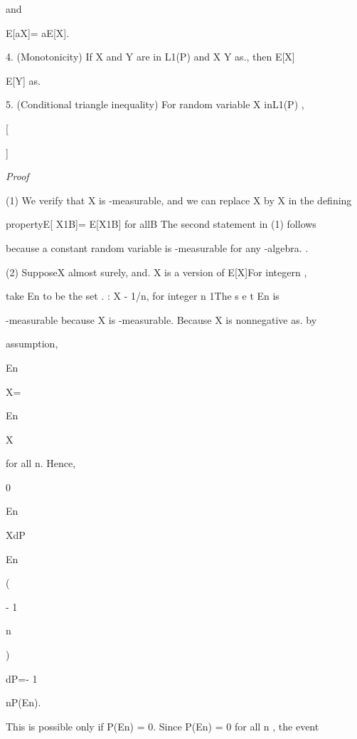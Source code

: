 and

E[aX\vert{}]= aE[X\vert{}].

4. (Monotonicity) If X and Y are in L1(P) and X \leq Y as., then E[X\vert{}]\leq

E[Y\vert{}] as.

5. (Conditional triangle inequality) For random variable X inL1(P) ,

\vert\vert{}

\vert\vert\vert \leqE

[

\vertX\vert\vert {}

]

\textit{Proof}

(1) We verify that X is -measurable, and we can replace X by X in the defining

propertyE[ X1B]= E[X1B] for allB \in{}The second statement in (1) follows

because a constant random variable is -measurable for any \sigma-algebra. .

(2) SupposeX  almost surely, and. X is a version of E[X\vert{}]For integern ,

take En to be the set .{ : X \leq- 1/n}, for integer n \geq 1The s e t En is

-measurable because X is -measurable. Because X is nonnegative as. by

assumption,

\int

En

X=

\int

En

X 

for all n. Hence,

0 \leq

\int

En

XdP \leq

\int

En

(

- 1

n

)

dP=- 1

nP(En).

This is possible only if P(En) = 0. Since P(En) = 0 for all n , the event

